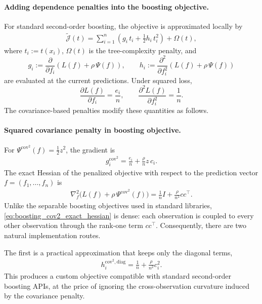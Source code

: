 \documentclass[12pt, draft]{article}
\theoremstyle{plain}
\theoremstyle{definition}
\newcommand{\1}{\mathbf{1}}
\begin{document}
\paragraph{Adding dependence penalties into the boosting objective.}
For standard second-order boosting, the objective is approximated locally by
\begin{align}
    \label{eq:boosting_local_objective}
    \widetilde{\mathcal J}(t)
    =
    \sum_{i=1}^n
    \left(
        g_i\,t_i + \frac{1}{2}h_i\,t_i^2
    \right)
    +
    \Omega(t),
\end{align}
where \(t_i := t(x_i)\), \(\Omega(t)\) is the tree-complexity penalty, and
\[
g_i := \frac{\partial}{\partial f_i}
\left(
L(f) + \rho\,\Psi(f)
\right),
\qquad
h_i := \frac{\partial^2}{\partial f_i^2}
\left(
L(f) + \rho\,\Psi(f)
\right)
\]
are evaluated at the current predictions. Under squared loss,
\[
\frac{\partial L(f)}{\partial f_i} = \frac{e_i}{n},
\qquad
\frac{\partial^2 L(f)}{\partial f_i^2} = \frac{1}{n}.
\]
The covariance-based penalties modify these quantities as follows.

\paragraph{Squared covariance penalty in boosting objective.}
For \(\Psi^{\mathrm{cov}^2}(f)=\tfrac12 z^2\), the gradient is
\begin{align}
    \label{eq:boosting_cov2_gradient}
    g_i^{\mathrm{cov}^2}
    =
    \frac{e_i}{n}
    +
    \frac{\rho}{n}z\,c_i.
\end{align}
The exact Hessian of the penalized objective with respect to the prediction vector \(f=(f_1,\dots,f_n)\) is
\begin{align}
    \label{eq:boosting_cov2_exact_hessian}
    \nabla_f^2
    \bigl(L(f)+\rho\,\Psi^{\mathrm{cov}^2}(f)\bigr)
    =
    \frac{1}{n}I
    +
    \frac{\rho}{n^2}cc^\top.
\end{align}
Unlike the separable boosting objectives used in standard libraries, \eqref{eq:boosting_cov2_exact_hessian} is dense: each observation is coupled to every other observation through the rank-one term \(cc^\top\). Consequently, there are two natural implementation routes.

The first is a practical approximation that keeps only the diagonal terms,
\begin{align}
    \label{eq:boosting_cov2_diag_hessian}
    h_i^{\mathrm{cov}^2,\mathrm{diag}}
    =
    \frac{1}{n}
    +
    \frac{\rho}{n^2}c_i^2.
\end{align}
This produces a custom objective compatible with standard second-order boosting APIs, at the price of ignoring the cross-observation curvature induced by the covariance penalty.
\end{document}
